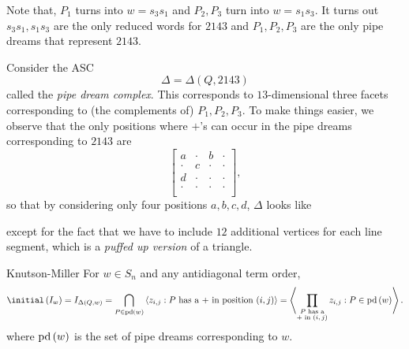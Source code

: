 \documentclass[co439]{subfiles}
\begin{document}
\begin{example}{}
        Note that, $P_1$ turns into $w = s_3s_1$ and $P_2,P_3$ turn into $w = s_1s_3$. It turns out $s_3s_1, s_1s_3$ are the only reduced words for $2143$ and $P_1,P_2,P_3$ are the only pipe dreams that represent $2143$.

        Consider the ASC
        \begin{equation*}
            \Delta = \Delta\left( Q, 2143 \right)
        \end{equation*}
        called the \emph{pipe dream complex}. This corresponds to $13$-dimensional three facets corresponding to (the complements of) $P_1,P_2,P_3$. To make things easier, we observe that the only positions where $+$'s can occur in the pipe dreams corresponding to $2143$ are
        \begin{equation*}
            \begin{bmatrix}
            	a & \cdot & b & \cdot \\
            	\cdot & c & \cdot & \cdot \\
            	d & \cdot & \cdot & \cdot \\
            	\cdot & \cdot & \cdot & \cdot \\
            \end{bmatrix},
        \end{equation*}
        so that by considering only four positions $a,b,c,d$, $\Delta$ looks like
        \begin{center}
        \end{center}
        except for the fact that we have to include $12$ additional vertices for each line segment, which is a \textit{puffed up version} of a triangle.
    \end{example}

    \rruleline

    \begin{theorem}{Knutson-Miller}
        For $w\in S_n$ and any antidiagonal term order,
        \begin{equation*}
            \initial\left( I_w \right) = I_{\Delta\left( Q,w \right)} = \bigcap^{}_{P\in\pd\left( w \right)} \left< z_{i,j} : P\text{ has a $+$ in position $\left( i,j \right)$} \right> = \left< \prod^{}_{\substack{\text{$P$ has a}\\\text{$+$ in $\left( i,j \right)$}}} z_{i,j} : P\in\pd\left( w \right) \right>. 
        \end{equation*}
        where $\operatorname{pd}\left( w \right)$ is the set of pipe dreams corresponding to $w$.
    \end{theorem}
    
\end{document}
